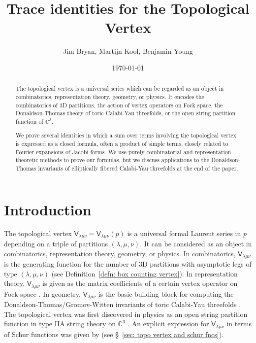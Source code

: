 \documentclass[12pt]{amsart}
\title{Trace identities for the Topological Vertex}
\author{Jim Bryan, Martijn Kool, Benjamin Young}
\date{\today}
\newcommand{\cnums} {{\mathbb C}}          %
\newcommand{\Vsf}{\mathsf{V}}
\theoremstyle{definition}
\begin{document}
\begin{abstract}
The topological vertex is a universal series which can be regarded as
an object in combinatorics, representation theory, geometry, or
physics. It encodes the combinatorics of 3D partitions, the action of
vertex operators on Fock space, the Donaldson-Thomas theory of toric
Calabi-Yau threefolds, or the open string partition function of
$\cnums^{3}$.

We prove several identities in which a sum over terms involving the
topological vertex is expressed as a closed formula, often a product
of simple terms, closely related to Fourier expansions of Jacobi
forms. We use purely combinatorial and representation theoretic
methods to prove our formulas, but we discuss applications to the
Donaldson-Thomas invariants of elliptically fibered Calabi-Yau
threefolds at the end of the paper. 
\end{abstract}

\maketitle 





\section{Introduction}\label{sec: intro}

The topological vertex $\Vsf_{\lambda \mu \nu}=\Vsf_{\lambda \mu
\nu}(p)$ is a universal formal Laurent series in $p$ depending on a
triple of partitions $(\lambda, \mu, \nu )$. It can be considered as
an object in combinatorics, representation theory, geometry, or
physics. In combinatorics, $\Vsf_{\lambda \mu \nu}$ is the generating
function for the number of 3D partitions with asymptotic legs of type
$(\lambda, \mu, \nu )$ (see Definition~\ref{defn: box counting
vertex}). In representation theory, $\Vsf_{\lambda \mu \nu}$ is given
as the matrix coefficients of a certain vertex operator on Fock space
\cite{Ok-Re-Va}. In geometry, $\Vsf_{\lambda \mu \nu}$ is the basic
building block for computing the Donaldson-Thomas/Gromov-Witten
invariants of toric Calabi-Yau threefolds \cite{MNOP1}. The
topological vertex was first discovered in physics as an open string
partition function in type IIA string theory on $\cnums^{3}$
\cite{AKMV}. An explicit expression for $\Vsf_{\lambda \mu \nu}$ in
terms of Schur functions was given by \cite{Ok-Re-Va} (see
\S~\ref{sec: topo vertex and schur fncs}).
\end{document}
